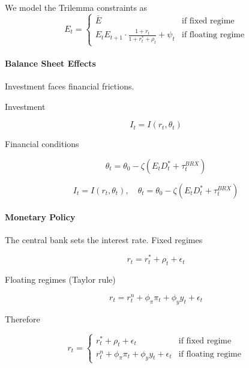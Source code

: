 \documentclass[
]{article}
\begin{document}
We model the Trilemma constraints as%
\begin{equation}
E_t =
\begin{cases} 
\bar{E} & \text{if fixed regime} \\
E_t E_{t+1} \cdot \frac{1 + r_t}{1 + r_t^* + \rho_t} + \psi_t & \text{if floating regime}
\end{cases}
\label{eq:uip}
\end{equation}

\paragraph*{Balance Sheet Effects}

Investment faces financial frictions.

Investment

\begin{equation*}
I_t = I(r_t, \theta_t)
\end{equation*}

Financial conditions

\begin{equation*}
\theta_t = \theta_0 - \zeta (E_t D_t^* + \tau_t^{BRX})
\end{equation*}

\begin{equation}
I_t = I(r_t, \theta_t), \quad \theta_t = \theta_0 - \zeta (E_t D_t^* + \tau_t^{BRX})
\label{eq:bs}
\end{equation}

\paragraph*{Monetary Policy}

The central bank sets the interest rate. Fixed regimes

\begin{equation*}
r_t = r_t^* + \rho_t + \epsilon_t
\end{equation*}

Floating regimes (Taylor rule)

\begin{equation*}
r_t = r_t^n + \phi_\pi \pi_t + \phi_y y_t + \epsilon_t
\end{equation*}

Therefore 

\begin{equation}
r_t =
\begin{cases} 
r_t^* + \rho_t + \epsilon_t & \text{if fixed regime} \\
r_t^n + \phi_\pi \pi_t + \phi_y y_t + \epsilon_t & \text{if floating regime}
\end{cases}
\label{eq:taylor}
\end{equation}
\end{document}
